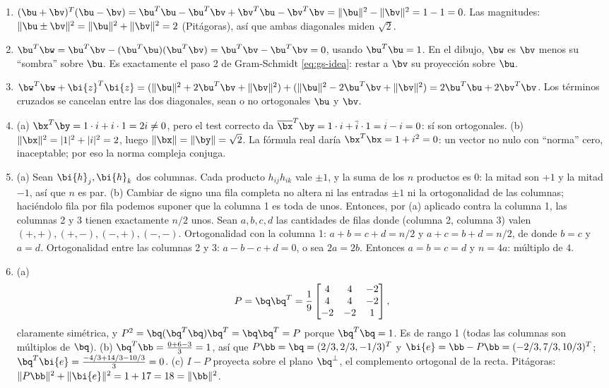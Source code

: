 \begin{enumerate}[leftmargin=*,label=\textbf{\thechapter.\arabic*}]

\item $(\bu+\bv)^T(\bu-\bv)=\bu^T\bu-\bu^T\bv+\bv^T\bu
-\bv^T\bv=\|\bu\|^2-\|\bv\|^2=1-1=0$. Las magnitudes:
$\|\bu\pm\bv\|^2=\|\bu\|^2+\|\bv\|^2=2$ (Pitágoras), así que ambas
diagonales miden $\sqrt2$.

\item $\bu^T\bw=\bu^T\bv-(\bu^T\bu)(\bu^T\bv)
=\bu^T\bv-\bu^T\bv=0$, usando $\bu^T\bu=1$. En el dibujo,
$\bw$ es $\bv$ menos su ``sombra'' sobre $\bu$. Es exactamente el paso 2 de
Gram-Schmidt \eqref{eq:gs-idea}: restar a $\bv$ su proyección sobre $\bu$.

\item
$\bw^T\bw+\bi{z}^T\bi{z}
=(\|\bu\|^2+2\bu^T\bv+\|\bv\|^2)+(\|\bu\|^2-2\bu^T\bv+\|\bv\|^2)
=2\bu^T\bu+2\bv^T\bv$. Los términos cruzados se cancelan entre las
dos diagonales, sean o no ortogonales $\bu$ y $\bv$.

\item (a) $\bx^T\by=1\cdot i+i\cdot1=2i\ne0$, pero el test correcto da
$\overline{\bx}^T\by=1\cdot i+\overline{i}\cdot1=i-i=0$: sí son
ortogonales. (b) $\|\bx\|^2=|1|^2+|i|^2=2$, luego $\|\bx\|=\|\by\|=\sqrt2$.
La fórmula real daría $\bx^T\bx=1+i^2=0$: un vector no nulo con
``norma'' cero, inaceptable; por eso la norma compleja conjuga.

\item (a) Sean $\bi{h}_j,\bi{h}_k$ dos columnas. Cada producto
$h_{ij}h_{ik}$ vale $\pm1$, y la suma de los $n$ productos es $0$: la mitad
son $+1$ y la mitad $-1$, así que $n$ es par. (b) Cambiar de signo una fila
completa no altera ni las entradas $\pm1$ ni la ortogonalidad de las
columnas; haciéndolo fila por fila podemos suponer que la columna 1 es toda
de unos. Entonces, por (a) aplicado contra la columna 1, las columnas 2 y 3
tienen exactamente $n/2$ unos. Sean $a,b,c,d$ las cantidades de filas donde
(columna 2, columna 3) valen $(+,+),(+,-),(-,+),(-,-)$. Ortogonalidad con la
columna 1: $a+b=c+d=n/2$ y $a+c=b+d=n/2$, de donde $b=c$ y $a=d$.
Ortogonalidad entre las columnas 2 y 3: $a-b-c+d=0$, o sea $2a=2b$. Entonces
$a=b=c=d$ y $n=4a$: múltiplo de $4$.

\item (a)
\[
P=\bq\bq^T=\frac19\begin{bmatrix}4&4&-2\\4&4&-2\\-2&-2&1\end{bmatrix},
\]
claramente simétrica, y $P^2=\bq(\bq^T\bq)\bq^T=\bq\bq^T=P$
porque $\bq^T\bq=1$. Es de rango 1 (todas las columnas son múltiplos de
$\bq$). (b) $\bq^T\bb=\frac{0+6-3}{3}=1$, así que
$P\bb=\bq=(2/3,2/3,-1/3)^T$ y
$\bi{e}=\bb-P\bb=(-2/3,7/3,10/3)^T$;
$\bq^T\bi{e}=\frac{-4/3+14/3-10/3}{3}=0$. (c) $I-P$ proyecta sobre el
plano $\bq^{\perp}$, el complemento ortogonal de la recta. Pitágoras:
$\|P\bb\|^2+\|\bi{e}\|^2=1+17=18=\|\bb\|^2$.


\end{enumerate}
